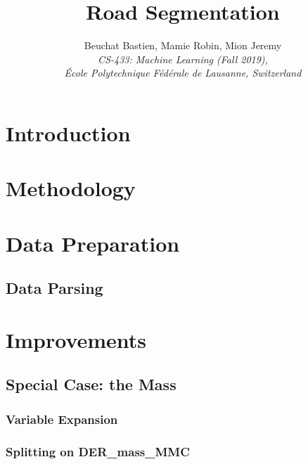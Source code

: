 \documentclass[10pt,conference,compsocconf]{IEEEtran}
\begin{document}
\title{Road Segmentation}

\author{
  Beuchat Bastien, Mamie Robin, Mion Jeremy\\
  \textit{CS-433: Machine Learning (Fall 2019),}\\
   \textit{École Polytechnique Fédérale de Lausanne, Switzerland}
}

\maketitle

\begin{abstract}

\end{abstract}


\section{Introduction}

\section{Methodology}

\section{Data Preparation}

\subsection{Data Parsing}

\section{Improvements}

\subsection{Special Case: the Mass} \label{mass}

\subsubsection{Variable Expansion}\label{variable expansion}


\subsubsection{Splitting on DER\_mass\_MMC} \label{split mass}
\end{document}
